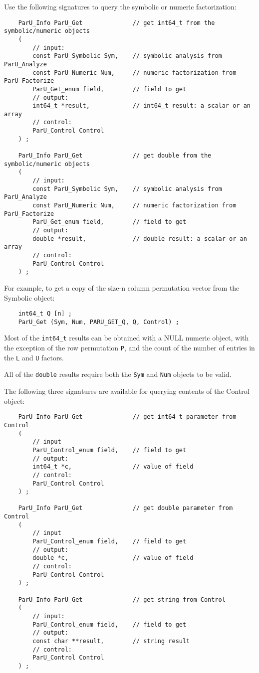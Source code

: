 \documentclass[12pt]{article}
\begin{document}
Use the following signatures to query the symbolic or numeric factorization:

    {\footnotesize
    \begin{verbatim}
    ParU_Info ParU_Get              // get int64_t from the symbolic/numeric objects
    (
        // input:
        const ParU_Symbolic Sym,    // symbolic analysis from ParU_Analyze
        const ParU_Numeric Num,     // numeric factorization from ParU_Factorize
        ParU_Get_enum field,        // field to get
        // output:
        int64_t *result,            // int64_t result: a scalar or an array
        // control:
        ParU_Control Control
    ) ;

    ParU_Info ParU_Get              // get double from the symbolic/numeric objects
    (
        // input:
        const ParU_Symbolic Sym,    // symbolic analysis from ParU_Analyze
        const ParU_Numeric Num,     // numeric factorization from ParU_Factorize
        ParU_Get_enum field,        // field to get
        // output:
        double *result,             // double result: a scalar or an array
        // control:
        ParU_Control Control
    ) ; \end{verbatim}}

For example, to get a copy of the size-n column permutation vector from the
Symbolic object:

    {\footnotesize
    \begin{verbatim}
    int64_t Q [n] ;
    ParU_Get (Sym, Num, PARU_GET_Q, Q, Control) ; \end{verbatim}}

Most of the \verb'int64_t' results can be obtained with a NULL numeric object,
with the exception of the row permutation \verb'P', and the count of the number
of entries in the \verb'L' and \verb'U' factors.

All of the \verb'double' results require both the \verb'Sym' and \verb'Num'
objects to be valid.

The following three signatures are available for querying contents of the
Control object:

    {\footnotesize
    \begin{verbatim}
    ParU_Info ParU_Get              // get int64_t parameter from Control
    (
        // input
        ParU_Control_enum field,    // field to get
        // output:
        int64_t *c,                 // value of field
        // control:
        ParU_Control Control
    ) ;

    ParU_Info ParU_Get              // get double parameter from Control
    (
        // input
        ParU_Control_enum field,    // field to get
        // output:
        double *c,                  // value of field
        // control:
        ParU_Control Control
    ) ;

    ParU_Info ParU_Get              // get string from Control
    (
        // input:
        ParU_Control_enum field,    // field to get
        // output:
        const char **result,        // string result
        // control:
        ParU_Control Control
    ) ; \end{verbatim}}
\end{document}
